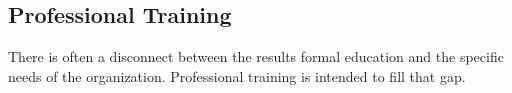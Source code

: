 \subsection{Professional Training}

There is often a disconnect between the results formal education and the specific needs of the organization. Professional training is intended to fill that gap.  